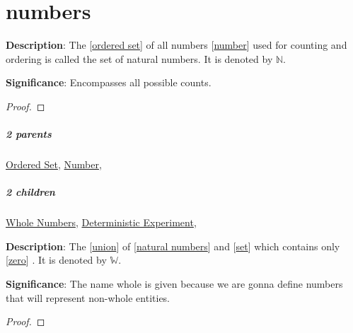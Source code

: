 \documentclass[../main.tex]{subfiles}
\begin{document}
\chapter{numbers}



\begin{statement}
\label{statement:Natural Numbers}\hspace*{0pt}\par
\end{statement}
\textbf{Description}:
  The [\hyperref[statement:Ordered Set]{ordered set}] of all numbers [\hyperref[statement:Number]{number}] used for counting and ordering is called the set of natural numbers. It is denoted by $ \mathbb{N}$.
\par
{\color{magenta} \textbf{Significance}:
  Encompasses all possible counts.
\par}
\begin{proof}
\proofbydefinition
\end{proof}\par
\paragraph{2 parents} \hyperref[statement:Ordered Set]{Ordered Set}, \hyperref[statement:Number]{Number}, 
\paragraph{2 children} \hyperref[statement:Whole Numbers]{Whole Numbers}, \hyperref[statement:Deterministic Experiment]{Deterministic Experiment}, 



\begin{statement}
\label{statement:Whole Numbers}\hspace*{0pt}\par
\end{statement}
\textbf{Description}:
  The [\hyperref[statement:Union]{union}] of [\hyperref[statement:Natural Numbers]{natural numbers}] and [\hyperref[statement:Set]{set}] which contains only [\hyperref[statement:Zero]{zero}] . It is denoted by $ \mathbb{W}$.
\par
{\color{magenta} \textbf{Significance}:
  The name whole is given because we are gonna define numbers that will represent non-whole entities.
\par}
\begin{proof}
\proofbydefinition
\end{proof}\par
\end{document}
